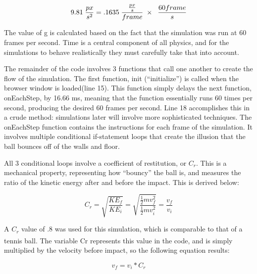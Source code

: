 \begin{equation} \label{eq:pixelsconversion}
9.81 \hspace{1mm}  \frac{px}{s^2}  = .1635 \hspace{1mm}  \frac{\frac{px}{s}}{frame} \hspace{1mm}  \times \hspace{1mm}  \hspace{1mm}  \frac{60 frame}{s}
\end{equation}


The value of g is calculated based on the fact that the simulation was run at 60 frames per second.  Time is a central component of all physics, and for the simulations to behave realistically they must carefully take that into account.  

The remainder of the code involves 3 functions that call one another to create the flow of the simulation.  The first function, init (``initialize'') is called when the browser window is loaded(line 15).  This function simply delays the next function, onEachStep, by 16.66 ms, meaning that the function essentially runs 60 times per second, producing the desired 60 frames per second.  Line 18 accomplishes this in a crude method: simulations later will involve more sophisticated techniques.  The onEachStep function contains the instructions for each frame of the simulation.  It involves multiple conditional if-statement loops that create the illusion that the ball bounces off of the walls and floor.  

All 3 conditional loops involve a coefficient of restitution, or $C_r$.  This is a mechanical property, representing how ``bouncy'' the ball is, and measures the ratio of the kinetic energy after and before the impact.  This is derived below:

\begin{equation}\label{eq:cr}
C_r = \sqrt{\frac{KE_f}{KE_i}} = \sqrt{\frac{\frac{1}{2} mv_f^2}{\frac{1}{2} mv_i^2}} = \frac{v_f}{v_i}
\end{equation}

A $C_r$ value of .8 was used for this simulation, which is comparable to that of a tennis ball\textsuperscript{\cite{tennisball}}.  The variable Cr represents this value in the code, and is simply multiplied by the velocity before impact, so the following equation results:

\begin{equation}\label{eq:velocitycr}
v_f = v_i * C_r
\end{equation}

